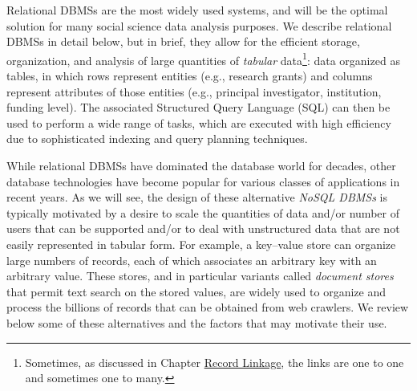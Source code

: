 \documentclass[]{krantz}
\begin{document}
Relational DBMSs are the most widely used systems, and will be the
optimal solution for many social science data analysis purposes. We
describe relational DBMSs in detail below, but in brief, they allow for
the efficient storage, organization, and analysis of large quantities of
\emph{tabular} data\footnote{Sometimes, as discussed in Chapter
  \protect\hyperlink{chap:link}{Record Linkage}, the links are one to
  one and sometimes one to many.}: data organized as tables, in which
rows represent entities (e.g., research grants) and columns represent
attributes of those entities (e.g., principal investigator, institution,
funding level). The associated Structured Query Language (SQL) can then
be used to perform a wide range of tasks, which are executed with high
efficiency due to sophisticated indexing and query planning techniques.

While relational DBMSs have dominated the database world for decades,
other database technologies have become popular for various classes of
applications in recent years. As we will see, the design of these
alternative \emph{NoSQL DBMSs} is typically motivated by a desire to
scale the quantities of data and/or number of users that can be
supported and/or to deal with unstructured data that are not easily
represented in tabular form. For example, a key--value store can
organize large numbers of records, each of which associates an arbitrary
key with an arbitrary value. These stores, and in particular variants
called \emph{document stores} that permit text search on the stored
values, are widely used to organize and process the billions of records
that can be obtained from web crawlers. We review below some of these
alternatives and the factors that may motivate their use.
\end{document}
